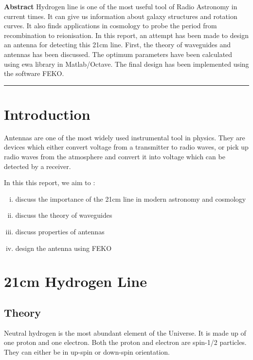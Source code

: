 \documentclass[12pt]{article}
\begin{document}
\newpage
{}
\begin{center}
	\doublespacing
	\textbf{\Large Abstract} \linebreak
	21cm Hydrogen line is one of the most useful tool of Radio Astronomy in current times. It can give us information about galaxy structures and rotation curves. It also finds applications in cosmology to probe the period from recombination to reionisation. \linebreak
  In this report, an attempt has been made to design an antenna for detecting this 21cm line. First, the theory of waveguides and antennas has been discussed. The optimum parameters have been calculated using ewa library in Matlab/Octave. The final design has been implemented using the software FEKO. 
\end{center}
\rule{17cm}{1pt}
\section{Introduction}
Antennas are one of the most widely used instrumental tool in physics. They are devices which either convert voltage from a transmitter to radio waves, or pick up radio waves from the atmosphere and convert it into voltage which can be detected by a receiver. \linebreak

In this this report, we aim to :
\begin{enumerate}[i.)]
  \item discuss the importance of the 21cm line in modern astronomy and cosmology
  \item discuss the theory of waveguides
  \item discuss properties of antennas
  \item design the antenna using FEKO 
\end{enumerate} 
\section{21cm Hydrogen Line}
\subsection{Theory}
Neutral hydrogen is the most abundant element of the Universe. It is made up of one proton and one electron. 
Both the proton and electron are spin-1/2 particles. They can either be in up-spin or down-spin orientation. \linebreak
\end{document}

